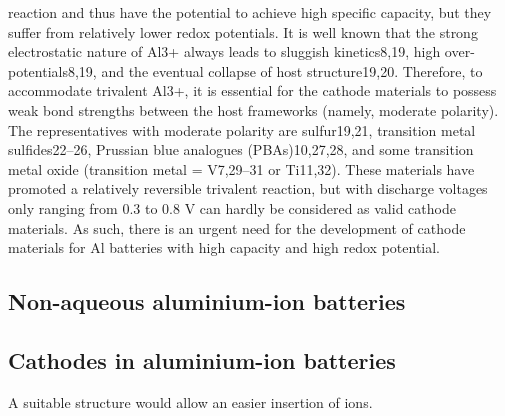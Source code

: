 reaction and thus have the potential to achieve high specific capacity, but they suffer from relatively lower redox potentials. It is well known that the strong electrostatic nature of Al3+ always leads to sluggish kinetics8,19, high over-potentials8,19, and the eventual collapse of host structure19,20. Therefore, to accommodate trivalent Al3+, it is essential for the cathode materials to possess weak bond strengths between the host frameworks (namely, moderate polarity). The representatives with moderate polarity are sulfur19,21, transition metal sulfides22–26, Prussian blue analogues (PBAs)10,27,28, and some transition metal oxide (transition metal = V7,29–31 or Ti11,32). These materials have promoted a relatively reversible trivalent reaction, but with discharge voltages only ranging from 0.3 to 0.8 V can hardly be considered as valid cathode materials. As such, there is an urgent need for the development of cathode materials for Al
batteries with high capacity and high redox potential.

\subsection{Non-aqueous aluminium-ion batteries}

\subsection{Cathodes in aluminium-ion batteries}
A suitable structure would allow an easier insertion of ions. 